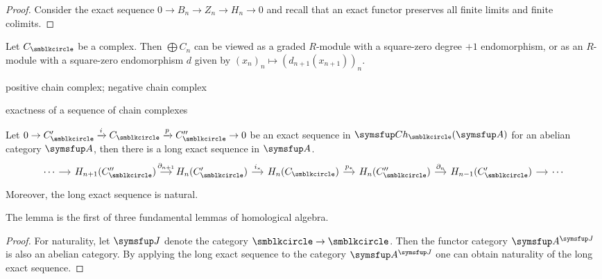 \begin{proof}
  Consider the exact sequence $0\to B_n\to Z_n\to H_n\to 0$ and recall that an exact functor preserves all finite limits and finite colimits.
\end{proof}

Let $C_\CCCIR$ be a complex. Then $\bigoplus C_n$ can be viewed as a graded $R$-module with a square-zero degree $+1$ endomorphism, or as an $R$-module with a square-zero endomorphism $d$ given by $(x_n)_n\mapsto (d_{n+1}(x_{n+1}))_n$.

positive chain complex; negative chain complex

exactness of a sequence of chain complexes

\begin{lemma}
  Let $0\to C_\CCCIR'\xrightarrow{i} C_\CCCIR \xrightarrow{p} C_\CCCIR''\to 0$ be an exact sequence in $\CH(\CAT{A})$ for an abelian category $\CAT{A}$, then there is a long exact sequence in $\CAT{A}$.
  \begin{equation*}
    \begin{tikzcd}[sep=small]
      \dotsb & H_{n+1}(C_\CCCIR'') & H_n(C_\CCCIR') & H_n(C_\CCCIR) & H_n(C_\CCCIR'') & H_{n-1}(C_\CCCIR') & \dotsb
      \arrow[from=1-1,]{1-2}[]{}
      \arrow[from=1-2,]{1-3}[]{\partial_{n+1}}
      \arrow[from=1-3,]{1-4}[]{i_*}
      \arrow[from=1-4,]{1-5}[]{p_*}
      \arrow[from=1-5,]{1-6}[]{\partial_n}
      \arrow[from=1-6,]{1-7}[]{}
    \end{tikzcd}
  \end{equation*}
  Moreover, the long exact sequence is natural.
\end{lemma}

The lemma is the first of three fundamental lemmas of homological algebra.

\begin{proof}
  For naturality, let $\CAT{J}$ denote the category $\BCIR\to\BCIR$. Then the functor category $\CAT{A}^{\CAT{J}}$ is also an abelian category. By applying the long exact sequence to the category $\CAT{A}^{\CAT{J}}$ one can obtain naturality of the long exact sequence.
\end{proof}

\begin{lemma}

\end{lemma}

